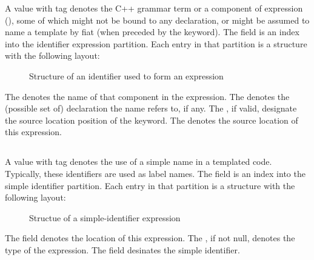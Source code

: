 A  value with tag 
 denotes the C++ grammar term  or a component of  expression (),
 some of which might
not be bound to any declaration, or might be assumed to name a template by fiat (when preceded by the  keyword).
The  field is an index into the identifier expression partition.  Each entry in that partition
is a structure with the following layout:
%
\begin{figure}[H]
	\centering
	\caption{Structure of an identifier used to form an expression}
	\label{fig:ifc-identifier-expr-structure}
\end{figure}
%
The  denotes the name of that component in the  expression.
The  denotes the (possible set of) declaration the name refers to, if any.
The , if valid, designate the source location position of the  keyword.
The  denotes the source location of this expression.




\subsection{}
\label{sec:ifc:ExprSort:SimpleIdentifier}

A  value with tag  denotes the use of a simple name 
in a templated code.  Typically, these identifiers are used as label names.  The  field is an index
into the simple identifier partition.  Each entry in that partition is a structure with the following layout:
%
\begin{figure}[H]
	\centering
	\caption{Structue of a simple-identifier expression}
	\label{fig:ifc-simple-identifier-structure}
\end{figure}
%
The  field denotes the location of this expression.  The , if not null, denotes the
type of the expression.  The  field desinates the simple identifier.

